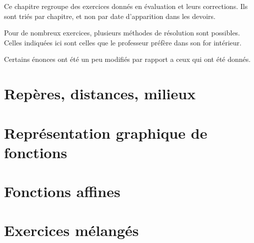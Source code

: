 
\begin{center}
    Ce chapitre regroupe des exercices donnés en évaluation et leurs corrections. Ils sont triés par chapitre, et non par date d'apparition dans les devoirs.

    Pour de nombreux exercices, plusieurs méthodes de résolution sont possibles. Celles indiquées ici sont celles que le professeur préfère dans son for intérieur.    
\end{center}
Certains énonces ont été un peu modifiés par rapport a ceux qui ont été donnés.

\section{Repères, distances, milieux}


\section{Représentation graphique de fonctions}


\section{Fonctions affines}


\vspace{2cm}

\section{Exercices mélangés}


